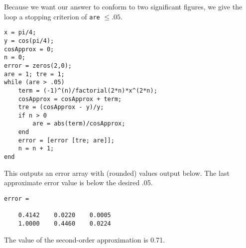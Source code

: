 \documentclass[12pt]{amsart}
\begin{document}
Because we want our answer to conform to two significant figures, we
give the loop a stopping criterion of {\tt are} $\leq .05$.

\begin{verbatim}
x = pi/4;
y = cos(pi/4);
cosApprox = 0;
n = 0;
error = zeros(2,0);
are = 1; tre = 1;
while (are > .05)
    term = (-1)^(n)/factorial(2*n)*x^(2*n);
    cosApprox = cosApprox + term;
    tre = (cosApprox - y)/y;
    if n > 0
        are = abs(term)/cosApprox;
    end
    error = [error [tre; are]];
    n = n + 1;
end 
\end{verbatim}

This outputs an error array with (rounded) values
output below. The last approximate error value is
below the desired .05.
\begin{verbatim}
error =

    0.4142    0.0220    0.0005
    1.0000    0.4460    0.0224
\end{verbatim}

The value of the second-order approximation is 0.71.
\end{document}
